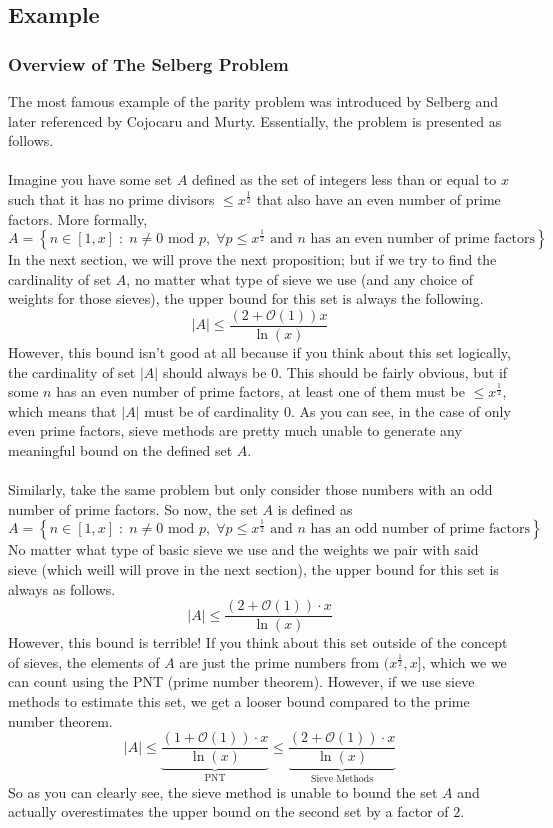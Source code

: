 \subsection{Example}
\subsubsection{Overview of The Selberg Problem}
The most famous example of the parity problem was introduced by Selberg and later referenced by Cojocaru and Murty. Essentially, the problem is presented as follows.\\
\\
Imagine you have some set $A$ defined as the set of integers less than or equal to $x$ such that it has no prime divisors $\leq x^\frac{1}{2}$ that also have an even number of prime factors. More formally,
$$
A = \left\{n \in [1,x] \;:\; n \neq 0 \text{ mod }p, \;\forall p\leq x^{\frac{1}{2}} \text{ and } n \text{ has an even number of prime factors}\right\}
$$
In the next section, we will prove the next proposition; but if we try to find the cardinality of set $A$, no matter what type of sieve we use (and any choice of weights for those sieves), the upper bound for this set is always the following.
$$
|A| \leq \frac{(2 + \mathcal{O}(1))x}{\ln(x)}
$$
However, this bound isn't good at all because if you think about this set logically, the cardinality of set $|A|$ should always be $0$. This should be fairly obvious, but if some $n$ has an even number of prime factors, at least one of them must be $\leq x^{\frac{1}{2}}$, which means that $|A|$ must be of cardinality $0$. As you can see, in the case of only even prime factors, sieve methods are pretty much unable to generate any meaningful bound on the defined set $A$. \\
\\
Similarly, take the same problem but only consider those numbers with an odd number of prime factors. So now, the set $A$ is defined as
$$
A = \left\{n \in [1,x] \;:\; n \neq 0 \text{ mod }p, \;\forall p\leq x^{\frac{1}{2}} \text{ and } n \text{ has an odd number of prime factors}\right\}
$$
No matter what type of basic sieve we use and the weights we pair with said sieve (which weill will prove in the next section), the upper bound for this set is always as follows.
$$
|A| \leq \frac{(2 + \mathcal{O}(1)) \cdot x}{\ln(x)}
$$
However, this bound is terrible! If you think about this set outside of the concept of sieves, the elements of $A$ are just the prime numbers from $(x^{\frac{1}{2}}, x]$, which we we can count using the PNT (prime number theorem). However, if we use sieve methods to estimate this set, we get a looser bound compared to the prime number theorem.
$$
|A| \leq \underbrace{\frac{\left(1 + \mathcal{O}(1)\right) \cdot x}{\ln (x)}}_{\text{PNT}} \leq \underbrace{\frac{(2 + \mathcal{O}(1)) \cdot x}{\ln(x)}}_{\text{Sieve Methods}}
$$
So as you can clearly see, the sieve method is unable to bound the set $A$ and actually overestimates the upper bound on the second set by a factor of $2$.
